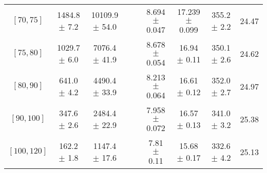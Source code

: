 \begin{tabular}{c||c|c|c|c|c|c|c||c}
$[70, 75]$ & 1484.8 $\pm$ 7.2 & 10109.9 $\pm$ 54.0 &  &  & 8.694 $\pm$ 0.047 & 17.239 $\pm$ 0.099 & 355.2 $\pm$ 2.2 & 24.47\\
$[75, 80]$ & 1029.7 $\pm$ 6.0 & 7076.4 $\pm$ 41.9 &  &  & 8.678 $\pm$ 0.054 & 16.94 $\pm$ 0.11 & 350.1 $\pm$ 2.6 & 24.62\\
$[80, 90]$ & 641.0 $\pm$ 4.2 & 4490.4 $\pm$ 33.9 &  &  & 8.213 $\pm$ 0.064 & 16.61 $\pm$ 0.12 & 352.0 $\pm$ 2.7 & 24.97\\
$[90, 100]$ & 347.6 $\pm$ 2.6 & 2484.4 $\pm$ 22.9 &  &  & 7.958 $\pm$ 0.072 & 16.57 $\pm$ 0.13 & 341.0 $\pm$ 3.2 & 25.38\\
$[100, 120]$ & 162.2 $\pm$ 1.8 & 1147.4 $\pm$ 17.6 &  &  & 7.81 $\pm$ 0.11 & 15.68 $\pm$ 0.17 & 332.6 $\pm$ 4.2 & 25.13\\
\end{tabular}
